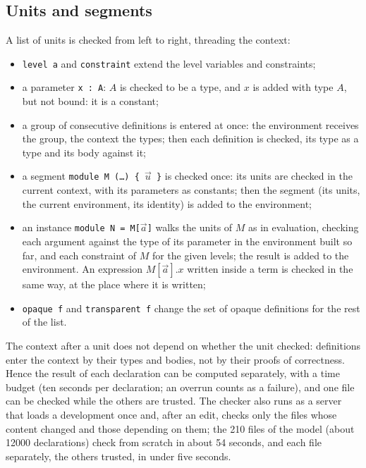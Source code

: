 \documentclass[11pt]{article}
\newcommand{\kw}[1]{\texttt{#1}}
\theoremstyle{remark}
\begin{document}
\subsection{Units and segments}\label{sec:impl-units}

A list of units is checked from left to right, threading the context:
\begin{itemize}
\item \kw{level a} and \kw{constraint} extend the level variables and
  constraints;
\item a parameter \kw{x : A}: $A$ is checked to be a type, and $x$ is
  added with type $A$, but not bound: it is a constant;
\item a group of consecutive definitions is entered at once: the
  environment receives the group, the context the types; then each
  definition is checked, its type as a type and its body against it;
\item a segment \kw{module M (\dots) \{ $\vec u$ \}} is checked once: its
  units are checked in the current context, with its parameters as
  constants; then the segment (its units, the current environment, its
  identity) is added to the environment;
\item an instance \kw{module N = M[$\vec a$]} walks the units of $M$ as in
  evaluation, checking each argument against the type of its parameter
  in the environment built so far, and each constraint of $M$ for the
  given levels; the result is added to the environment. An expression
  $M[\vec a].x$ written inside a term is checked in the same way, at the
  place where it is written;
\item \kw{opaque f} and \kw{transparent f} change the set of opaque
  definitions for the rest of the list.
\end{itemize}

The context after a unit does not depend on whether the unit checked:
definitions enter the context by their types and bodies, not by their
proofs of correctness. Hence the result of each declaration can be
computed separately, with a time budget (ten seconds per declaration;
an overrun counts as a failure), and one file can be checked while the
others are trusted. The checker also runs as a server that loads a
development once and, after an edit, checks only the files whose content
changed and those depending on them; the 210 files of the model (about
12000 declarations) check from scratch in about 54 seconds, and each file
separately, the others trusted, in under five seconds.
\end{document}
